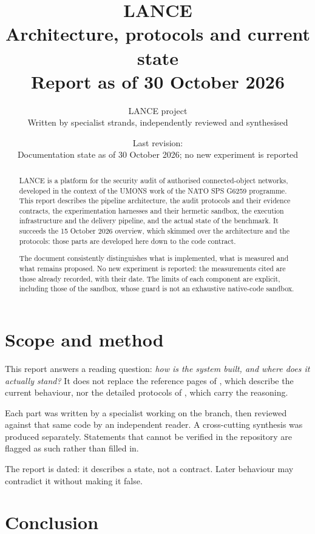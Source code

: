 \documentclass[11pt,a4paper]{article}
\title{LANCE\\[4pt]
\large Architecture, protocols and current state\\[2pt]
\normalsize Report as of 30 October 2026}
\author{LANCE project\\\small Written by specialist strands, independently reviewed and synthesised}
\date{Last revision: \revision\\[3pt]
\small Documentation state as of 30 October 2026; no new experiment is reported}
\DeclareRobustCommand{\code}[1]{{\small\path{#1}}}
\begin{document}
\maketitle

\begin{abstract}
LANCE is a platform for the security audit of authorised connected-object
networks, developed in the context of the UMONS work of the NATO SPS G6259
programme. This report describes the pipeline architecture, the audit protocols
and their evidence contracts, the experimentation harnesses and their hermetic
sandbox, the execution infrastructure and the delivery pipeline, and the actual
state of the benchmark. It succeeds the 15 October 2026 overview, which skimmed
over the architecture and the protocols: those parts are developed here down to
the code contract.

The document consistently distinguishes what is implemented, what is measured and
what remains proposed. No new experiment is reported: the measurements cited are
those already recorded, with their date. The limits of each component are
explicit, including those of the sandbox, whose guard is not an exhaustive
native-code sandbox.
\end{abstract}

\tableofcontents
\clearpage





\section{Scope and method}
\label{sec:scope}

This report answers a reading question: \emph{how is the system built, and where
does it actually stand?} It does not replace the reference pages of \code{docs/},
which describe the current behaviour, nor the detailed protocols of
\code{research/}, which carry the reasoning.

Each part was written by a specialist working on the \code{dev/1} branch, then
reviewed against that same code by an independent reader. A cross-cutting
synthesis was produced separately. Statements that cannot be verified in the
repository are flagged as such rather than filled in.

The report is dated: it describes a state, not a contract. Later behaviour may
contradict it without making it false.







\section{Conclusion}


\end{document}
